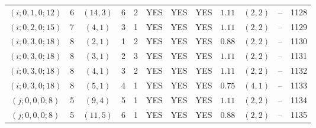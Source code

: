 \begin{longtable}{|c|c|c|c|c|c|c|c|c|c|c|c|}
$(i;0,1,0;12)$ & 6 & $(14,3)$ & 6 & 2 & YES & YES & YES & $1.11$ & $(2,2)$ & -- & 1128\\
$(i;0,2,0;15)$ & 7 & $(4,1)$ & 3 & 1 & YES & YES & YES & $1.11$ & $(2,2)$ & -- & 1129\\
$(i;0,3,0;18)$ & 8 & $(2,1)$ & 1 & 2 & YES & YES & YES & $0.88$ & $(2,2)$ & -- & 1130\\
$(i;0,3,0;18)$ & 8 & $(3,1)$ & 2 & 3 & YES & YES & YES & $1.11$ & $(2,2)$ & -- & 1131\\
$(i;0,3,0;18)$ & 8 & $(4,1)$ & 3 & 2 & YES & YES & YES & $1.11$ & $(2,2)$ & -- & 1132\\
$(i;0,3,0;18)$ & 8 & $(5,1)$ & 4 & 1 & YES & YES & YES & $0.75$ & $(4,1)$ & -- & 1133\\
$(j;0,0,0;8)$ & 5 & $(9,4)$ & 5 & 1 & YES & YES & YES & $1.11$ & $(2,2)$ & -- & 1134\\
$(j;0,0,0;8)$ & 5 & $(11,5)$ & 6 & 1 & YES & YES & YES & $0.88$ & $(2,2)$ & -- & 1135
\end{longtable}
